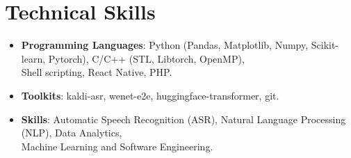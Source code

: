 \section{Technical Skills}
\begin{itemize}[noitemsep,leftmargin=*]
    \item \textbf{Programming Languages}: Python (Pandas, Matplotlib, Numpy, Scikit-learn, Pytorch), C/C++ (STL, Libtorch, OpenMP), \\
        Shell scripting, React Native, PHP.
    \item \textbf{Toolkits}: kaldi-asr, wenet-e2e, huggingface-transformer, git.
    \item \textbf{Skills}: Automatic Speech Recognition (ASR), Natural Language Processing (NLP), Data Analytics, \\
        Machine Learning and Software Engineering.
\end{itemize}
